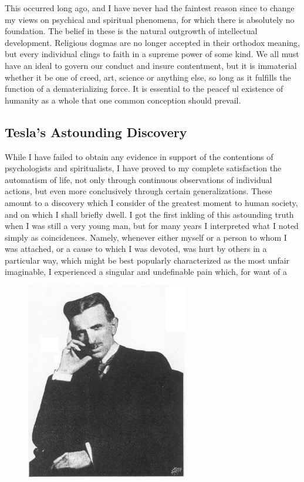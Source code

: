 \documentclass[a4paper,12pt,english,twoside,openright]{memoir}
\begin{document}
This occurred long ago, and I have never had the faintest reason since to change my views on 
psychical and spiritual phenomena, for which there is absolutely no foundation.  The belief in 
these is the natural outgrowth of intellectual development.  Religious dogmas are no longer 
accepted in their orthodox meaning, but every individual clings to faith in a supreme power of 
some kind.  We all must have an ideal to govern our conduct and insure contentment, but it is 
immaterial whether it be one of creed, art, science or anything else, so long as it fulfills the 
function of a dematerializing force.  It is essential to the peacef ul existence of humanity as a 
whole that one common conception should prevail.  

\subsection{Tesla's Astounding Discovery}
While I have failed to obtain any evidence in support of the contentions of psychologists and 
spiritualists, I have proved to my complete satisfaction the automatism of life, not only through 
continuous observations of individual actions, but even more conclusively through certain 
generalizations.  These amount to a discovery which I consider of the greatest moment to human 
society, and on which I shall briefly dwell.  I got the first inkling of this astounding truth when I was 
still a very young man, but for many years I interpreted what I noted simply as coincidences.  
Namely, whenever either myself or a person to whom I was attached, or a cause to which I was 
devoted, was hurt by others in a particular way, which might be best popularly characterized as 
the most unfair imaginable, I experienced a singular and undefinable pain which, for want of a 
\begin{figure}
	\vspace{-20pt}
	\begin{center}
		\includegraphics[width=0.63\textwidth]{Tesla-Younger.png}
	\end{center}
	\vspace{-20pt}
\end{figure}
\end{document}
